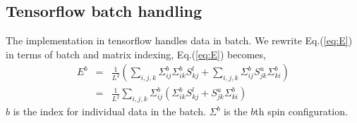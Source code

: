 \documentclass{article}
\begin{document}
\subsection{Tensorflow batch handling}
The implementation in tensorflow handles data in batch. We rewrite 
Eq.(\ref{eq:E}) in terms
of batch and matrix indexing, Eq.(\ref{eq:E}) becomes,
\begin{eqnarray} \nonumber
E^b & = & \frac{1}{L^2} \left( 
             \sum_{i,j,k} \Sigma^b_{ij} \Sigma^b_{ik} S^l_{kj} +
             \sum_{i,j,k} \Sigma^b_{ij} S^u_{jk} \Sigma^b_{ki} 
          \right) \\
    & = & \frac{1}{L^2} \sum_{i,j,k} \Sigma^b_{ij}\left( 
              \Sigma^b_{ik} S^l_{kj} + S^u_{jk} \Sigma^b_{ki} 
          \right) 
\end{eqnarray}
$b$ is the index for individual data in the batch. $\Sigma^b$ is the $b$th
spin configuration.
\end{document}
